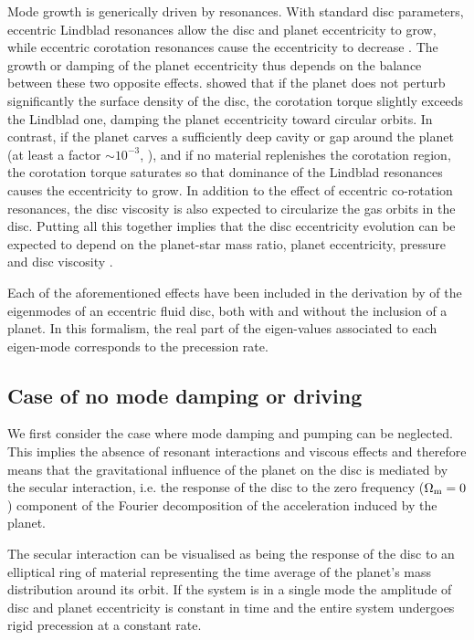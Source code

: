 \documentclass[usenatbib,a4paper,times,fleqn]{mnras}
\begin{document}
Mode growth is generically driven by resonances. With standard disc parameters, eccentric Lindblad resonances allow the disc and planet eccentricity to grow, while eccentric corotation resonances cause the eccentricity to decrease \citep{goldreich1980,goldreich2003,ogilvie2003}. The growth or damping of the planet eccentricity thus depends on the balance between these two opposite effects. \citet{goldreich1980} showed that if the planet does not perturb significantly the surface density of the disc, the corotation torque slightly exceeds the Lindblad one, damping the planet eccentricity toward circular orbits. In contrast, if the planet carves a sufficiently deep cavity or gap around the planet (at least a factor $\sim 10^{-3}$, \citealp{duffell2015}), and if no material replenishes the corotation region, the corotation torque saturates \citep{goldreich2003,ogilvie2003} so that dominance of the Lindblad resonances causes the eccentricity to grow. 
In addition to the effect of eccentric co-rotation resonances, the disc viscosity is also expected to circularize the gas orbits in the disc. Putting all this together implies that the disc eccentricity evolution can be expected to depend on the planet-star mass ratio,  planet eccentricity, pressure and disc viscosity \citep{artymowicz1994,crida2006}.

Each of the aforementioned effects have been included in the derivation by \citet{teyssandier2016} of the eigenmodes of an eccentric fluid disc, both with and without the inclusion of a planet.
In this formalism, the real part of the eigen-values associated to each eigen-mode corresponds to the precession rate.

\subsection{Case of no mode damping or driving}

We first consider the case where mode damping and pumping can be neglected. This implies the absence of resonant interactions and viscous effects and therefore means that the gravitational influence of the planet on the disc is mediated by the secular interaction, i.e. the response of the disc to the zero frequency ($\Omega_{\rm m} = 0$) component of the Fourier decomposition of the acceleration induced by the  planet.

The secular interaction can be visualised as being the response of the disc to an elliptical ring of material representing the  time average of the planet's mass distribution around its orbit. If the system is in a single mode the amplitude of disc and planet eccentricity is constant in time and the entire system undergoes rigid precession at a constant rate.
\end{document}
